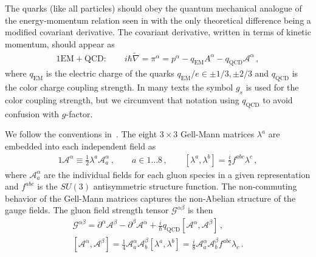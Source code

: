 The quarks (like all particles) should obey the quantum mechanical analogue of the energy-momentum relation seen in  with the only theoretical difference being a modified covariant derivative. The covariant derivative, written in terms of kinetic momentum, should appear as
\begin{alignat}{1}
    \label{eq:spin:08}
    \mathrm{EM+QCD}:\qquad i\hbar\widetilde\nabla=\pi^{\alpha}=p^{\alpha}-q_\mathrm{EM}A^{\alpha}-q_\mathrm{QCD}\mathcal{A}^{\alpha}\,,
\end{alignat}
where $q_\mathrm{EM}$ is the electric charge of the quarks $q_\mathrm{EM}/e\in\pm1/3,\pm2/3$ and $q_\mathrm{QCD}$ is the color charge coupling strength. In many texts the symbol $g_{s}$ is used for the color coupling strength, but we circumvent that notation using $q_\mathrm{QCD}$ to avoid confusion with $g$-factor.

We follow the conventions in~\cite{greiner2006qcd}. The eight $3\times3$ Gell-Mann matrices $\lambda^{a}$ are embedded into each independent field as
\begin{alignat}{1}
	\label{eq:spin:09} \mathcal{A}^{\alpha}\equiv\frac{1}{2}\lambda^{a}\mathcal{A}^{\alpha}_{a}\,,\qquad a\in1\ldots8\,,\qquad
    [\lambda^{a},\lambda^{b}]=\frac{i}{2}f^{abc}\lambda^{c}\,,
\end{alignat}
where $\mathcal{A}_{a}^{\alpha}$ are the individual fields for each gluon species in a given representation and $f^{abc}$ is the $SU(3)$ antisymmetric structure function. The non-commuting behavior of the Gell-Mann matrices captures the non-Abelian structure of the gauge fields. The gluon field strength tensor $\mathcal{G}^{\alpha\beta}$ is then
\begin{gather}
	\label{eq:spin:10a}
    \mathcal{G}^{\alpha\beta} = \partial^{\alpha}\mathcal{A}^{\beta} -\partial^{\beta}\mathcal{A}^{\alpha} + \frac{i}{\hbar}q_\mathrm{QCD}\left[\mathcal{A}^{\alpha},\mathcal{A}^{\beta}\right]\,,\\
	\label{eq:spin:10b} \left[\mathcal{A}^{\alpha},\mathcal{A}^{\beta}\right] =
    \frac{1}{4}\mathcal{A}^{\alpha}_{a}\mathcal{A}^{\beta}_{b}\left[\lambda^{a},\lambda^{b}\right] =
    \frac{i}{8}\mathcal{A}^{\alpha}_{a}\mathcal{A}^{\beta}_{b}f^{abc}\lambda_{c}\,.
\end{gather}

